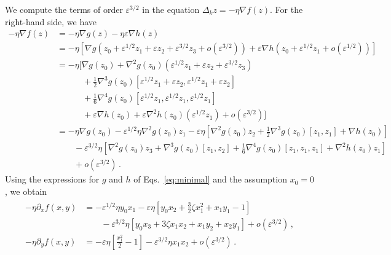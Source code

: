 \documentclass[11pt,english,reqno]{article}
\theoremstyle{plain}
\theoremstyle{definition}
\theoremstyle{remark}
\numberwithin{equation}{section}
\begin{document}
    We compute the terms of order $\varepsilon^{3/2}$ in the equation $\Delta_k z = - \eta \nabla f(z)$. For the right-hand side, we have
    \begin{align*}
    -\eta \nabla f(z) &= -\eta \nabla g(z) - \eta \varepsilon \nabla h(z) \nonumber\\
    &= -\eta \left[\nabla g\left(z_0 + \varepsilon^{1/2} z_1 + \varepsilon z_2 + \varepsilon^{3/2} z_3 + o(\varepsilon^{3/2})\right) + \varepsilon \nabla h\left(z_0 + \varepsilon^{1/2} z_1 + o(\varepsilon^{1/2})\right) \right]  \nonumber\\
    &= -\eta \bigg[\nabla g(z_0) + \nabla^2 g(z_0) \left(\varepsilon^{1/2} z_1 + \varepsilon z_2 + \varepsilon^{3/2} z_3\right) \\
    &\qquad\quad+ \frac{1}{2} \nabla^3 g(z_0) \left[\varepsilon^{1/2} z_1 + \varepsilon z_2 , \varepsilon^{1/2} z_1 + \varepsilon z_2 \right] \\
    &\qquad\quad+ \frac{1}{6} \nabla^4 g(z_0) \left[\varepsilon^{1/2} z_1, \varepsilon^{1/2} z_1, \varepsilon^{1/2} z_1 \right] \nonumber\\
    &\qquad\quad+ \varepsilon \nabla h (z_0) + \varepsilon \nabla^2h(z_0) \left(\varepsilon^{1/2}z_1\right) + o (\varepsilon^{3/2}) 
    \bigg] \nonumber\\
    &= -\eta \nabla g(z_0) -  \varepsilon^{1/2} \eta \nabla^2 g(z_0) z_1 - \varepsilon\eta \left[\nabla^2 g(z_0) z_2 + \frac{1}{2} \nabla^3 g(z_0) [z_1, z_1] + \nabla h(z_0)\right] \nonumber\\
    &\qquad
    - \varepsilon^{3/2}\eta \left[\nabla^2 g(z_0) z_3 + \nabla^3 g(z_0)[z_1, z_2] + \frac{1}{6} \nabla^4 g(z_0)[z_1, z_1, z_1] + \nabla^2h(z_0)z_1  \right]\\
    &\qquad+ o(\varepsilon^{3/2}) \, .
\end{align*}
Using the expressions for $g$ and $h$ of Eqs.~\eqref{eq:minimal} and the assumption $x_0 = 0$, we obtain 
\begin{align*}
    \begin{split}
    -\eta \partial_x f(x,y) &= - \varepsilon^{1/2} \eta y_0 x_1 - \varepsilon \eta \left[y_0 x_2 + \frac{3}{2} \zeta x_1^2 +  x_1 y_1 - 1\right] \\
    &\qquad- \varepsilon^{3/2} \eta \left[y_0 x_3 + 3 \zeta x_1 x_2 + x_1 y_2 + x_2 y_1\right]+ o(\varepsilon^{3/2}) \, , \\
    -\eta \partial_y f(x,y) &= - \varepsilon \eta \left[\frac{x_1^2}{2} - 1\right] - \varepsilon^{3/2} \eta x_1x_2 + o(\varepsilon^{3/2}) \, .
    \end{split}
\end{align*}
\end{document}
